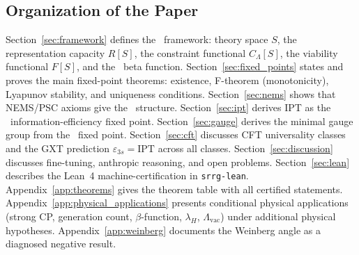 \documentclass[11pt]{article}
\theoremstyle{remark}
\newcommand{\SRRG}{\text{SRRG}}
\newcommand{\IPT}{\mathrm{IPT}}
\begin{document}
\subsection{Organization of the Paper}

Section~\ref{sec:framework} defines the \SRRG\ framework: theory space $S$, the
representation capacity $R[S]$, the constraint functional $C_\Lambda[S]$, the
viability functional $F[S]$, and the \SRRG\ beta function.
Section~\ref{sec:fixed_points} states and proves the main fixed-point theorems:
existence, F-theorem (monotonicity), Lyapunov stability, and uniqueness conditions.
Section~\ref{sec:nems} shows that NEMS/PSC axioms give the \SRRG\ structure.
Section~\ref{sec:ipt} derives IPT as the \SRRG\ information-efficiency fixed point.
Section~\ref{sec:gauge} derives the minimal gauge group from the \SRRG\ fixed point.
Section~\ref{sec:cft} discusses CFT universality classes and the GXT prediction
$\varepsilon_{3s} = \IPT$ across all classes.
Section~\ref{sec:discussion} discusses fine-tuning, anthropic reasoning, and open
problems.
Section~\ref{sec:lean} describes the Lean~4 machine-certification in \texttt{srrg-lean}.
Appendix~\ref{app:theorems} gives the theorem table with all certified statements.
Appendix~\ref{app:physical_applications} presents conditional physical applications
(strong CP, generation count, $\beta$-function, $\lambda_H$, $\Lambda_\mathrm{vac}$)
under additional physical hypotheses.
Appendix~\ref{app:weinberg} documents the Weinberg angle as a diagnosed negative result.
\end{document}
